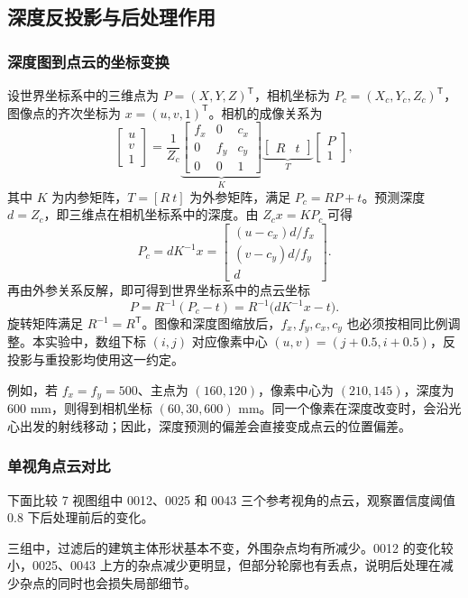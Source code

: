 \subsection{深度反投影与后处理作用}
\subsubsection{深度图到点云的坐标变换}

设世界坐标系中的三维点为 $P=(X,Y,Z)^\mathsf{T}$，相机坐标为 $P_c=(X_c,Y_c,Z_c)^\mathsf{T}$，图像点的齐次坐标为 $x=(u,v,1)^\mathsf{T}$。相机的成像关系为
\[
\begin{bmatrix}u\\v\\1\end{bmatrix}
=\frac{1}{Z_c}
\underbrace{\begin{bmatrix}f_x&0&c_x\\0&f_y&c_y\\0&0&1\end{bmatrix}}_{K}
\underbrace{\begin{bmatrix}R&t\end{bmatrix}}_{T}
\begin{bmatrix}P\\1\end{bmatrix},
\]
其中 $K$ 为内参矩阵，$T=[R\ t]$ 为外参矩阵，满足 $P_c=RP+t$。预测深度 $d=Z_c$，即三维点在相机坐标系中的深度。由 $Z_cx=KP_c$ 可得
\[
P_c=dK^{-1}x
=\begin{bmatrix}(u-c_x)d/f_x\\(v-c_y)d/f_y\\d\end{bmatrix}.
\]
再由外参关系反解，即可得到世界坐标系中的点云坐标
\[
\boxed{P=R^{-1}(P_c-t)=R^{-1}\bigl(dK^{-1}x-t\bigr)}.
\]
旋转矩阵满足 $R^{-1}=R^\mathsf T$。图像和深度图缩放后，$f_x,f_y,c_x,c_y$ 也必须按相同比例调整。本实验中，数组下标 $(i,j)$ 对应像素中心 $(u,v)=(j+0.5,i+0.5)$，反投影与重投影均使用这一约定。

例如，若 $f_x=f_y=500$、主点为 $(160,120)$，像素中心为 $(210,145)$，深度为 600 mm，则得到相机坐标 $(60,30,600)$ mm。同一个像素在深度改变时，会沿光心出发的射线移动；因此，深度预测的偏差会直接变成点云的位置偏差。

\subsubsection{单视角点云对比}
下面比较 7 视图组中 0012、0025 和 0043 三个参考视角的点云，观察置信度阈值 0.8 下后处理前后的变化。


三组中，过滤后的建筑主体形状基本不变，外围杂点均有所减少。0012 的变化较小，0025、0043 上方的杂点减少更明显，但部分轮廓也有丢点，说明后处理在减少杂点的同时也会损失局部细节。
